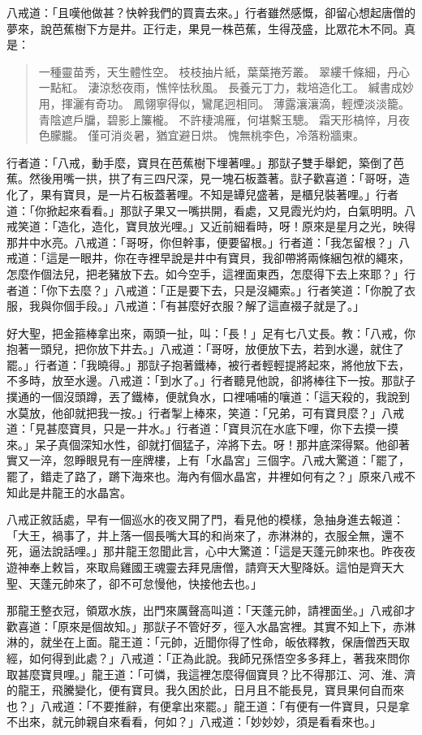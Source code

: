 八戒道：「且嘆他做甚？快幹我們的買賣去來。」行者雖然感慨，卻留心想起唐僧的夢來，說芭蕉樹下方是井。正行走，果見一株芭蕉，生得茂盛，比眾花木不同。真是：
\begin{quote}
一種靈苗秀，天生體性空。
枝枝抽片紙，葉葉捲芳叢。
翠縷千條細，丹心一點紅。
淒涼愁夜雨，憔悴怯秋風。
長養元丁力，栽培造化工。
緘書成妙用，揮灑有奇功。
鳳翎寧得似，鸞尾迥相同。
薄露瀼瀼滴，輕煙淡淡籠。
青陰遮戶牖，碧影上簾櫳。
不許棲鴻雁，何堪繫玉驄。
霜天形槁悴，月夜色朦朧。
僅可消炎暑，猶宜避日烘。
愧無桃李色，冷落粉牆東。
\end{quote}

行者道：「八戒，動手麼，寶貝在芭蕉樹下埋著哩。」那獃子雙手舉鈀，築倒了芭蕉。然後用嘴一拱，拱了有三四尺深，見一塊石板蓋著。獃子歡喜道：「哥呀，造化了，果有寶貝，是一片石板蓋著哩。不知是罈兒盛著，是櫃兒裝著哩。」行者道：「你掀起來看看。」那獃子果又一嘴拱開，看處，又見霞光灼灼，白氣明明。八戒笑道：「造化，造化，寶貝放光哩。」又近前細看時，呀！原來是星月之光，映得那井中水亮。八戒道：「哥呀，你但幹事，便要留根。」行者道：「我怎留根？」八戒道：「這是一眼井，你在寺裡早說是井中有寶貝，我卻帶將兩條綑包袱的繩來，怎麼作個法兒，把老豬放下去。如今空手，這裡面東西，怎麼得下去上來耶？」行者道：「你下去麼？」八戒道：「正是要下去，只是沒繩索。」行者笑道：「你脫了衣服，我與你個手段。」八戒道：「有甚麼好衣服？解了這直裰子就是了。」

好大聖，把金箍棒拿出來，兩頭一扯，叫：「長！」足有七八丈長。教：「八戒，你抱著一頭兒，把你放下井去。」八戒道：「哥呀，放便放下去，若到水邊，就住了罷。」行者道：「我曉得。」那獃子抱著鐵棒，被行者輕輕提將起來，將他放下去，不多時，放至水邊。八戒道：「到水了。」行者聽見他說，卻將棒往下一按。那獃子撲通的一個沒頭蹲，丟了鐵棒，便就負水，口裡哺哺的嚷道：「這天殺的，我說到水莫放，他卻就把我一按。」行者掣上棒來，笑道：「兄弟，可有寶貝麼？」八戒道：「見甚麼寶貝，只是一井水。」行者道：「寶貝沉在水底下哩，你下去摸一摸來。」呆子真個深知水性，卻就打個猛子，淬將下去。呀！那井底深得緊。他卻著實又一淬，忽睜眼見有一座牌樓，上有「水晶宮」三個字。八戒大驚道：「罷了，罷了，錯走了路了，蹡下海來也。海內有個水晶宮，井裡如何有之？」原來八戒不知此是井龍王的水晶宮。

八戒正敘話處，早有一個巡水的夜叉開了門，看見他的模樣，急抽身進去報道：「大王，禍事了，井上落一個長嘴大耳的和尚來了，赤淋淋的，衣服全無，還不死，逼法說話哩。」那井龍王忽聞此言，心中大驚道：「這是天蓬元帥來也。昨夜夜遊神奉上敕旨，來取烏雞國王魂靈去拜見唐僧，請齊天大聖降妖。這怕是齊天大聖、天蓬元帥來了，卻不可怠慢他，快接他去也。」

那龍王整衣冠，領眾水族，出門來厲聲高叫道：「天蓬元帥，請裡面坐。」八戒卻才歡喜道：「原來是個故知。」那獃子不管好歹，徑入水晶宮裡。其實不知上下，赤淋淋的，就坐在上面。龍王道：「元帥，近聞你得了性命，皈依釋教，保唐僧西天取經，如何得到此處？」八戒道：「正為此說。我師兄孫悟空多多拜上，著我來問你取甚麼寶貝哩。」龍王道：「可憐，我這裡怎麼得個寶貝？比不得那江、河、淮、濟的龍王，飛騰變化，便有寶貝。我久困於此，日月且不能長見，寶貝果何自而來也？」八戒道：「不要推辭，有便拿出來罷。」龍王道：「有便有一件寶貝，只是拿不出來，就元帥親自來看看，何如？」八戒道：「妙妙妙，須是看看來也。」

